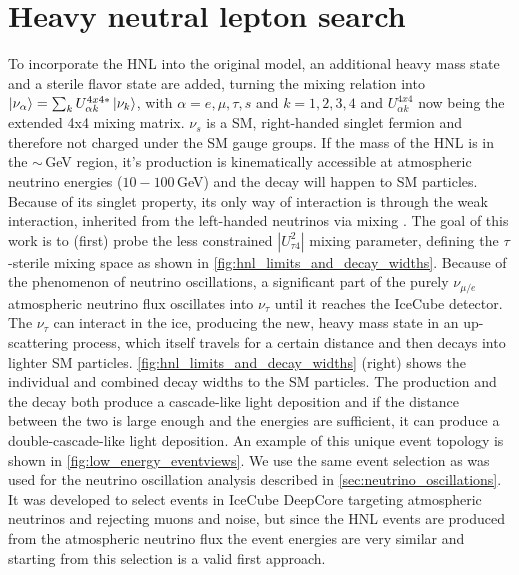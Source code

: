 \documentclass[a4paper,11pt]{article}
\begin{document}
\vspace{-0.5cm}
\section{Heavy neutral lepton search}

To incorporate the HNL into the original model, an additional heavy mass state and a sterile flavor state are added, turning the mixing relation into $\ket{\nu_\alpha} = \sum_kU^{4x4*}_{\alpha k}\ket{\nu_k}$, with $\alpha=e,\mu,\tau,s$ and $k=1,2,3,4$ and $U^{4x4}_{\alpha k}$ now being the extended 4x4 mixing matrix. $\nu_s$ is a SM, right-handed singlet fermion and therefore not charged under the SM gauge groups. If the mass of the HNL is in the $\sim$\,GeV region, it's production is kinematically accessible at atmospheric neutrino energies ($10-100$\,GeV) and the decay will happen to SM particles. Because of its singlet property, its only way of interaction is through the weak interaction, inherited from the left-handed neutrinos via mixing \cite{Coloma:2020lgy}. The goal of this work is to (first) probe the less constrained $|U_{\tau4}^2|$ mixing parameter, defining the $\tau$-sterile mixing space as shown in \cref{fig:hnl_limits_and_decay_widths}. Because of the phenomenon of neutrino oscillations, a significant part of the purely $\nu_{\mu/e}$ atmospheric neutrino flux oscillates into $\nu_\tau$ until it reaches the IceCube detector. The $\nu_\tau$ can interact in the ice, producing the new, heavy mass state in an up-scattering process, which itself travels for a certain distance and then decays into lighter SM particles. \cref{fig:hnl_limits_and_decay_widths} (right) shows the individual and combined decay widths to the SM particles. The production and the decay both produce a cascade-like light deposition and if the distance between the two is large enough and the energies are sufficient, it can produce a double-cascade-like light deposition. An example of this unique event topology is shown in \cref{fig:low_energy_eventviews}. We use the same event selection as was used for the neutrino oscillation analysis described in \cref{sec:neutrino_oscillations}. It was developed to select events in IceCube DeepCore targeting atmospheric neutrinos and rejecting muons and noise, but since the HNL events are produced from the atmospheric neutrino flux the event energies are very similar and starting from this selection is a valid first approach.
\end{document}
